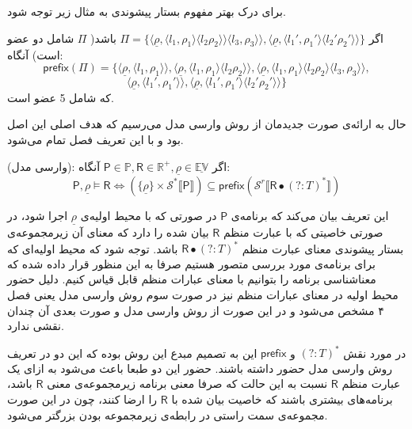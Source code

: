 برای درک بهتر مفهوم بستار پیشوندی به مثال زیر توجه شود.
\begin{exm}
	اگر 
	$\Pi = \{\langle\underline{\rho},\langle l_1 , \rho_1 \rangle 
	\langle l_2  \rho_2 \rangle\rangle  \langle l_3 , \rho_3 \rangle\rangle 
	,
	\langle\underline{\rho},\langle {l_1}' , {\rho_1}' \rangle  \langle {l_2}'  {\rho_2}' \rangle\rangle
	\}$ 
	باشد( $\Pi$ شامل دو عضو است) آنگاه:
	$$
	\mathsf{prefix}(\Pi)=
	\{
	\langle\underline{\rho},\langle l_1 , \rho_1 \rangle\rangle ,
	\langle\underline{\rho},\langle l_1 , \rho_1 \rangle  \langle l_2  \rho_2 \rangle\rangle,
	\langle\underline{\rho},\langle l_1 , \rho_1 \rangle  \langle l_2  \rho_2 \rangle  \langle l_3 , \rho_3 \rangle\rangle ,$$
	$$
	\langle\underline{\rho},\langle {l_1}' , {\rho_1}' \rangle\rangle,
	\langle\underline{\rho},\langle {l_1}' , {\rho_1}' \rangle  \langle {l_2}'  {\rho_2}' \rangle\rangle
	\}
	$$
	که شامل 5 عضو است.
\end{exm}
حال به ارائه‌ی صورت جدیدمان از روش وارسی مدل می‌رسیم که هدف اصلی این اصل بود و با این تعریف فصل تمام می‌شود.
\begin{defn}
(وارسی مدل):
	اگر 
	$\mathsf{P}\in\mathbb{P} , \mathsf{R} \in \mathbb{R}^+ , \underline{\rho} \in \underline{\mathbb{EV}}$
	آنگاه:
	$$\mathsf{P},\underline{\rho} \models \mathsf{R}
	 \Leftrightarrow
	(\{\underline{\rho}\}\times \mathcal{S}^* \llbracket\mathsf{P}\rrbracket) \subseteq 
	\mathsf{prefix} (\mathcal{S}^r \llbracket\mathsf{R} \bullet (?:\mathit{T})^*\rrbracket)
	$$
\end{defn}

این تعریف بیان می‌کند که برنامه‌ی 
$\mathsf{P}$
در صورتی که با محیط اولیه‌ی 
$\underline{\rho}$
اجرا شود، در صورتی خاصیتی که با عبارت منظم 
$\mathsf{R}$
بیان شده را دارد که معنای آن زیرمجموعه‌ی بستار پیشوندی معنای عبارت منظم
$\mathsf{R} \bullet (?:\mathit{T})^*$
باشد.
توجه شود که محیط اولیه‌ای که برای برنامه‌ی مورد بررسی متصور هستیم صرفا به این منظور قرار داده شده که معناشناسی برنامه را بتوانیم با معنای عبارات منظم قابل قیاس کنیم. دلیل حضور محیط اولیه در معنای عبارات منظم نیز در صورت سوم روش وارسی مدل یعنی فصل ۴ مشخص می‌شود و در این صورت از روش وارسی مدل و صورت بعدی آن چندان نقشی ندارد. 

در مورد نقش 
$ (?:\mathit{T})^*$
و
$ \mathsf{prefix} $
این به تصمیم مبدع این روش بوده که این دو در تعریف روش وارسی مدل حضور داشته باشند. حضور این دو طبعا باعث می‌شود به ازای یک عبارت منظم 
$\mathsf{R}$
نسبت به این حالت که صرفا معنی برنامه زیرمجموعه‌ی معنی 
$\mathsf{R}$
باشد، برنامه‌های بیشتری باشند که خاصیت بیان شده با 
$\mathsf{R}$
را ارضا کنند، چون در این صورت مجموعه‌ی سمت راستی در رابطه‌ی زیرمجموعه بودن بزرگتر می‌شود.

